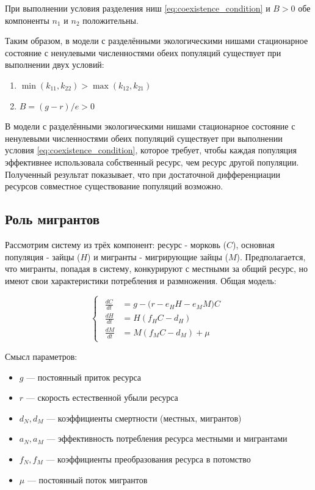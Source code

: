 \documentclass[a4paper, 14pt]{extarticle}
\begin{document}
При выполнении условия разделения ниш \eqref{eq:coexistence_condition} и $B > 0$ обе компоненты $n_1$ и $n_2$ положительны.

Таким образом, в модели с разделёнными экологическими нишами стационарное состояние с ненулевыми численностями обеих популяций существует при выполнении двух условий:

\begin{enumerate}
\item {} $\min(k_{11}, k_{22}) > \max(k_{12}, k_{21})$
\item {} $B = (g-r)/e > 0$
\end{enumerate}

В модели с разделёнными экологическими нишами стационарное состояние с ненулевыми численностями обеих популяций существует при выполнении условия \eqref{eq:coexistence_condition}, которое требует, чтобы каждая популяция эффективнее использовала собственный ресурс, чем ресурс другой популяции. Полученный результат показывает, что при достаточной дифференциации ресурсов совместное существование популяций возможно.

\subsection{Роль мигрантов}

Рассмотрим систему из трёх компонент: ресурс - морковь ($C$), основная популяция - зайцы ($H$) и мигранты - мигрирующие зайцы ($M$). Предполагается, что мигранты, попадая в систему, конкурируют с местными за общий ресурс, но имеют свои характеристики потребления и размножения. Общая модель:

\begin{equation}
\begin{cases}
\begin{aligned}
    \frac{dC}{dt} &= g - \bigl(r - e_H H - e_M M\bigr) C\\
    \frac{dH}{dt} &= H (f_H C - d_H)\\
    \frac{dM}{dt} &= M (f_M C - d_M) + \mu
\end{aligned}
\end{cases}
\label{eq:migrant_model}
\end{equation}

Смысл параметров:

\begin{itemize}
\item $g$ — постоянный приток ресурса
\item $r$ — скорость естественной убыли ресурса
\item $d_N, d_M$ — коэффициенты смертности (местных, мигрантов)
\item $a_N, a_M$ — эффективность потребления ресурса местными и мигрантами
\item $f_N, f_M$ — коэффициенты преобразования ресурса в потомство
\item $\mu$ — постоянный поток мигрантов
\end{itemize}
\end{document}
